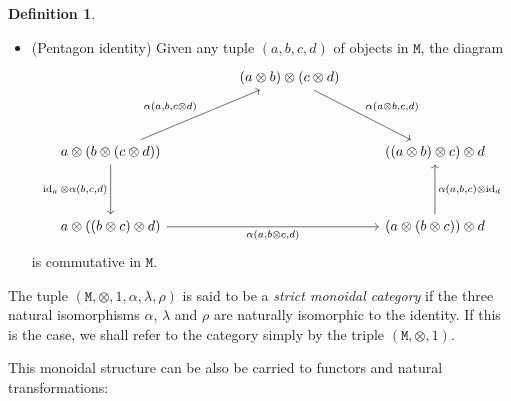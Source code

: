\documentclass[11pt, reqno]{amsart}
\theoremstyle{definition}
\newtheorem{definition}[theorem]{Definition}
\newcommand{\cat}{\texttt}
\DeclareMathOperator{\Id}{id}     %
\begin{document}
\begin{definition}
\begin{itemize}
\item (Pentagon identity) Given any tuple \((a, b, c, d)\) of objects in
  \(\cat M\), the diagram
  \[
  \begin{tikzcd}
  &
  &(a \otimes b) \otimes (c \otimes d)
  \ar[rdd, "{\alpha(a \otimes b, c, d)}"]
  &
  \\
  & & &
  \\
  a \otimes (b \otimes (c \otimes d))
  \ar[dd, "{\Id_a \otimes \alpha(b, c, d)}"']
  \ar[rruu, "{\alpha(a, b, c \otimes d)}"]
  &
  &
  &((a \otimes b) \otimes c) \otimes d
  \\
  & & &
  \\
  a \otimes ((b \otimes c) \otimes d)
  \ar[rrr, "{\alpha(a, b \otimes c, d)}"']
  &
  &
  &(a \otimes (b \otimes c)) \otimes d
  \ar[uu, "{\alpha(a, b, c) \otimes \Id_d}"']
  \end{tikzcd}
  \]
  is commutative in \(\cat M\).
\end{itemize}

The tuple \((\cat M, \otimes, 1, \alpha, \lambda, \rho)\) is said to be a
\emph{strict monoidal category} if the three natural isomorphisms \(\alpha\),
\(\lambda\) and \(\rho\) are naturally isomorphic to the identity. If this is
the case, we shall refer to the category simply by the triple
\((\cat M, \otimes, 1)\).
\end{definition}

This monoidal structure can be also be carried to functors and natural
transformations:
\end{document}
